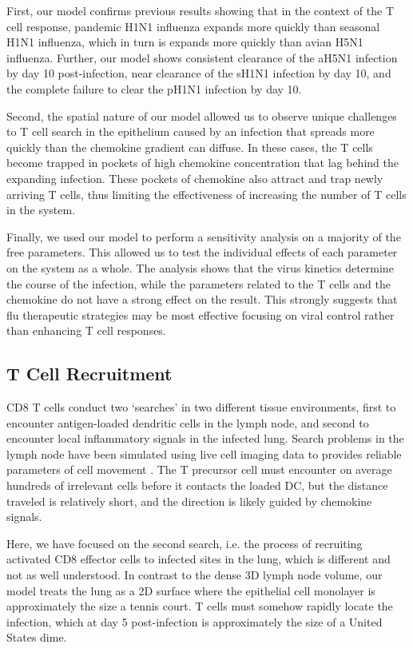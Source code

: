 \documentclass[10pt]{article}
\begin{document}
First, our model confirms previous results \cite{Mitchell2011} showing that in the context of the T cell response, pandemic H1N1 influenza expands more quickly than seasonal H1N1 influenza, which in turn is expands more quickly than avian H5N1 influenza.  Further, our model shows consistent clearance of the aH5N1 infection by day 10 post-infection, near clearance of the sH1N1 infection by day 10, and the complete failure to clear the pH1N1 infection by day 10.

Second, the spatial nature of our model allowed us to observe unique challenges to T cell search in the epithelium caused by an infection that spreads more quickly than the chemokine gradient can diffuse.  In these cases, the T cells become trapped in pockets of high chemokine concentration that lag behind the expanding infection.  These pockets of chemokine also attract and trap newly arriving T cells, thus limiting the effectiveness of increasing the number of T cells in the system.

Finally, we used our model to perform a sensitivity analysis on a majority of the free parameters.  This allowed us to test the individual effects of each parameter on the system as a whole.  The analysis shows that the virus kinetics determine the course of the infection, while the parameters related to the T cells and the chemokine do not have a strong effect on the result.  This strongly suggests that flu therapeutic strategies may be most effective focusing on viral control rather than enhancing T cell responses.

\subsection*{T Cell Recruitment}

CD8 T cells conduct two `searches' in two different tissue environments, first to encounter antigen-loaded dendritic cells in the lymph node, and second to encounter local inflammatory signals in the infected lung.  Search problems in the lymph node have been simulated using live cell imaging data to provides reliable parameters of cell movement \cite{Vroomans2012}.  The T precursor cell must encounter on average hundreds of irrelevant cells before it contacts the loaded DC, but the distance traveled is relatively short, and the direction is likely guided by chemokine signals.  

Here, we have focused on the second search, i.e. the process of recruiting activated CD8 effector cells to infected sites in the lung, which is different and not as well understood.  In contrast to the dense 3D lymph node volume, our model treats the lung as a 2D surface where the epithelial cell monolayer is approximately the size a tennis court.  T cells must somehow rapidly locate the infection, which at day 5 post-infection is approximately the size of a United States dime.
\end{document}
